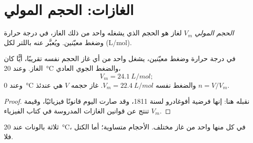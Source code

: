 \section{الغازات: الحجم المولي}

\begin{definition}\label{def:g10:the-mole:molar-volume}
\emph{الحجم المولي} $V_m$ لغاز هو الحجم الذي يشغله  واحد
من ذلك الغاز، في درجة حرارة وضغط معيّنين. ويُعبَّر عنه باللتر لكل 
(\si{L/mol}).
\end{definition}

\begin{proposition}\label{prop:g10:the-mole:avogadro-law}
في درجة حرارة وضغط معيّنين، يشغل  واحد من أي غاز الحجم نفسه تقريبًا، أيًّا
كان الغاز. وعند \qty{20}{\celsius} والضغط الجوي
العادي،
\[
  V_m = \qty{24.1}{L/mol};
\]
وعند \qty{0}{\celsius} والضغط نفسه $V_m = \qty{22.4}{L/mol}$. 
غاز حجمه $V$ هي عندئذ $n = V / V_m$.
\end{proposition}

\begin{proof}
نقبله هنا: إنها فرضية أفوغادرو لسنة 1811، وقد صارت اليوم قانونًا فيزيائيًا،
وقيمة $V_m$ تنتج عن قوانين الغازات المدروسة في كتاب
الفيزياء.
\end{proof}

\begin{omfigure}

{\small ثلاثة بالونات عند \qty{20}{\celsius}، في كل منها  واحد من غاز
مختلف. الأحجام متساوية؛ أما الكتل فلا.}
\end{omfigure}



